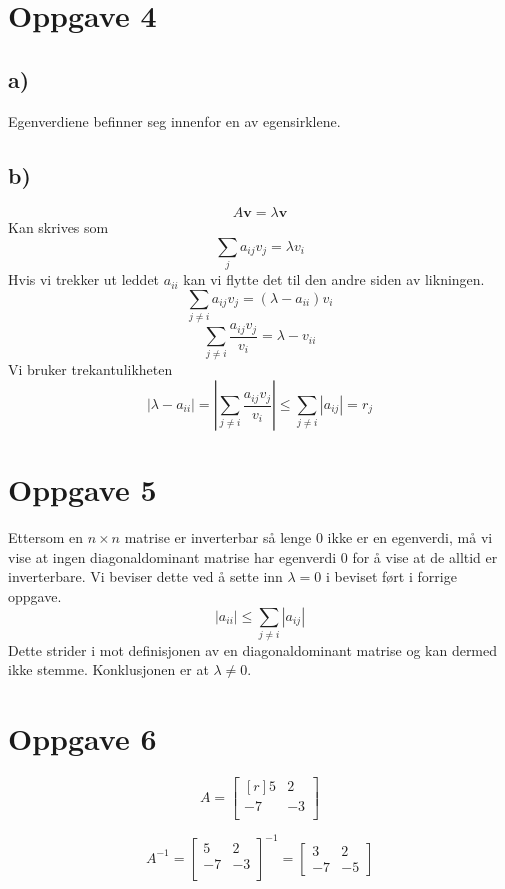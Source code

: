 \documentclass{article}
\begin{document}
\section*{Oppgave 4}
  \subsection*{a)}
    Egenverdiene befinner seg innenfor en av egensirklene. 
  
  \subsection*{b)}
  \[
  A \mathbf{v} = λ \mathbf{v}
  \]
  Kan skrives som 
  \[
  \sum_{j} a_{ij}v_j = λ v_i
  \]
  Hvis vi trekker ut leddet $ a_{ii} $ kan vi flytte det til den andre siden av likningen. 
  \[
  \sum_{j \neq i} a_{ij} v_{j} = (λ - a_{ii}) v_i
  \]  
  \[
  \sum_{j \neq i} \frac{a_{ij }v_j}{v_i} = \lambda - v_{ii}
  \]
  Vi bruker trekantulikheten
  \[
  \left\vert \lambda - a _{ii} \right|  = \left\vert \sum_{j \neq i} \frac{a_{ij } v_j}{v_i} \right\vert \le \sum_{j \neq i} \left\vert a_{ij } \right\vert = r_j
  \]

\section*{Oppgave 5}
  Ettersom en $ n × n $ matrise er inverterbar så lenge 0 ikke er en egenverdi, må vi vise at ingen diagonaldominant matrise har egenverdi 0 for å vise at de alltid er inverterbare. Vi beviser dette ved å sette inn $ λ = 0  $ i beviset ført i forrige oppgave. 
  \[
  \left\vert a_{ii } \right\vert \le \sum_{j \neq i} \left\vert a_{ij } \right\vert 
  \]
  Dette strider i mot definisjonen av en diagonaldominant matrise og kan dermed ikke stemme. Konklusjonen er at $ \lambda \neq 0 $. 

\section*{Oppgave 6}
  \[A=
  \begin{bmatrix*}[r]
   5 & 2 \\
   -7 & -3 \\
  \end{bmatrix*}
  \]

  \[ A^{-1} = 
    \begin{bmatrix}
      5 & 2 \\
      -7 & -3 \\
     \end{bmatrix}^{-1} = \begin{bmatrix}3 & 2\\-7 & -5\end{bmatrix}
  \]


\end{document}
